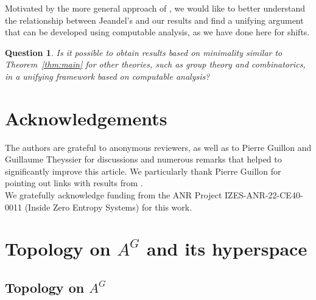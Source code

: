 \documentclass[french,american]{article}
\theoremstyle{plain}
\theoremstyle{definition}
\theoremstyle{remark}
\theoremstyle{plain}
\newtheorem{question}{Question}
\begin{document}
Motivated by the more general approach of \cite{jeandel2017enumeration}, we would like to better understand the relationship between Jeandel's and our results and find a unifying argument that can be developed using computable analysis, as we have done here for shifts.

\begin{question}\label{que:quasivar}
Is it possible to obtain results based on minimality similar to Theorem~\ref{thm:main} for other theories, such as group theory and combinatorics, in a unifying framework based on computable analysis?
\end{question}

\section*{Acknowledgements}  

	The authors are grateful to anonymous reviewers, as well as to Pierre Guillon and Guillaume Theyssier for discussions and numerous remarks that helped to significantly improve this article. We particularly thank Pierre Guillon for pointing out links with results from \cite{jeandel2017enumeration}. \\
	We gratefully acknowledge funding from the ANR Project IZES-ANR-22-CE40-0011 (Inside Zero Entropy Systems) for this work.




\appendix

\section[Topology on A\^{}G and its hyperspace]{Topology on $A^{G}$ and its hyperspace}\label{Appendix:Topology-on}

\subsection{Topology on $A^{G}$}\label{subsec:Topology-on-1}
\end{document}
